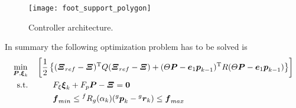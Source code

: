 \begin{figure}[!ht]
  \centering
  \texttt{[image: foot\_support\_polygon]}
  \caption{Controller architecture. \label{fig:control_architecuture}}
\end{figure}
\par
In summary the following optimization problem has to be solved is
\[
\begin{split}
  \min_{\boldsymbol{P}, \boldsymbol{\xi}_k} &  \quad \left[  \frac{1}{2}\left\{ (\boldsymbol{\Xi}_{ref} - \boldsymbol{\Xi})^{\mathrm{T}} Q (\boldsymbol{\Xi}_{ref} - \boldsymbol{\Xi}) + (\Theta \boldsymbol{P} - \boldsymbol{e}_1 \boldsymbol{p}_{k-1}) ^{\mathrm{T}} R (\Theta \boldsymbol{P} - \boldsymbol{e}_1 \boldsymbol{p}_{k-1}) \right\} \right]\\
  \text{s.t.} & \quad \quad \quad  F_{\xi} \boldsymbol{\xi}_k + F_{p} \boldsymbol{P}  - \boldsymbol{\Xi} = \boldsymbol{0}\\
  & \quad \quad \quad  \boldsymbol{f}_{min} \le {}^f R_g(\alpha_k) ({}^g \boldsymbol{p}_k - {}^ g \boldsymbol{r}_k) \le \boldsymbol{f}_{max}
\end{split}
\]
